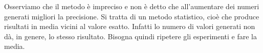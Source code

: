 \documentclass{article}
\begin{document}
\hfill

Osserviamo che il metodo è impreciso e non è detto che all'aumentare dei numeri generati migliori la precisione. Si tratta di un metodo statistico, cioè che produce risultati in media vicini al valore esatto. Infatti lo numero di valori generati non dà, in genere, lo stesso risultato. Bisogna quindi ripetere gli esperimenti e fare la media.
\end{document}
